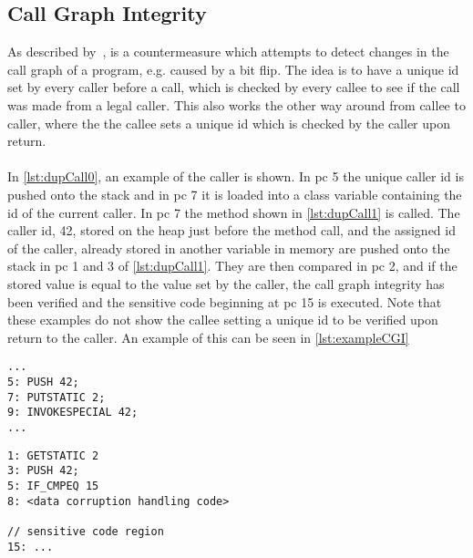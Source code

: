 \subsection{Call Graph Integrity} 
As described by~\cite{mksb}, is a countermeasure which attempts to detect changes in the call graph of a program, e.g. caused by a bit flip. The idea is to have a unique id set by every caller before a call, which is checked by every callee to see if the call was made from a legal caller. This also works the other way around from callee to caller, where the the callee sets a unique id which is checked by the caller upon return.\\\\
In \cref{lst:dupCall0}, an example of the caller is shown. In pc 5 the unique caller id is pushed onto the stack and in pc 7 it is loaded into a class variable containing the id of the current caller. In pc 7 the method shown in \cref{lst:dupCall1} is called. The caller id, 42, stored on the heap just before the method call, and the assigned id of the caller, already stored in another variable in memory are pushed onto the stack in pc 1 and 3 of \ref{lst:dupCall1}. They are then compared in pc 2, and if the stored value is equal to the value set by the caller, the call graph integrity has been verified and the sensitive code beginning at pc 15 is executed. Note that these examples do not show the callee setting a unique id to be verified upon return to the caller. An example of this can be seen in \cref{lst:exampleCGI}

\begin{minipage}{\linewidth}
\begin{lstlisting}[caption={Caller with call graph integrity implemented. The code is written in \jcl.},numbers=none, label={lst:dupCall0}]
...
5: PUSH 42; 
7: PUTSTATIC 2;
9: INVOKESPECIAL 42;
...
\end{lstlisting}
\end{minipage}

\begin{minipage}{\linewidth}
\begin{lstlisting}[caption={Callee with call graph integrity implemented. The code is written in \jcl.},numbers=none, label={lst:dupCall1}]
1: GETSTATIC 2
3: PUSH 42;
5: IF_CMPEQ 15
8: <data corruption handling code>

// sensitive code region
15: ...
\end{lstlisting}
\end{minipage}
